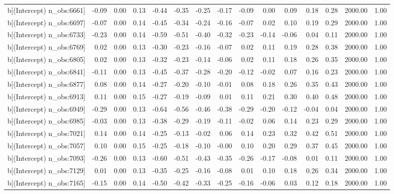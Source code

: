 \begin{table}[ht]
\begin{tabular}{rrrrrrrrrrrrrrr}
  b[(Intercept) n\_obs:6661] & -0.09 & 0.00 & 0.13 & -0.44 & -0.35 & -0.25 & -0.17 & -0.09 & 0.00 & 0.09 & 0.18 & 0.28 & 2000.00 & 1.00 \\ 
  b[(Intercept) n\_obs:6697] & -0.07 & 0.00 & 0.14 & -0.45 & -0.34 & -0.24 & -0.16 & -0.07 & 0.02 & 0.10 & 0.19 & 0.29 & 2000.00 & 1.00 \\ 
  b[(Intercept) n\_obs:6733] & -0.23 & 0.00 & 0.14 & -0.59 & -0.51 & -0.40 & -0.32 & -0.23 & -0.14 & -0.06 & 0.04 & 0.11 & 2000.00 & 1.00 \\ 
  b[(Intercept) n\_obs:6769] & 0.02 & 0.00 & 0.13 & -0.30 & -0.23 & -0.16 & -0.07 & 0.02 & 0.11 & 0.19 & 0.28 & 0.38 & 2000.00 & 1.00 \\ 
  b[(Intercept) n\_obs:6805] & 0.02 & 0.00 & 0.13 & -0.32 & -0.23 & -0.14 & -0.06 & 0.02 & 0.11 & 0.18 & 0.26 & 0.35 & 2000.00 & 1.00 \\ 
  b[(Intercept) n\_obs:6841] & -0.11 & 0.00 & 0.13 & -0.45 & -0.37 & -0.28 & -0.20 & -0.12 & -0.02 & 0.07 & 0.16 & 0.23 & 2000.00 & 1.00 \\ 
  b[(Intercept) n\_obs:6877] & 0.08 & 0.00 & 0.14 & -0.27 & -0.20 & -0.10 & -0.01 & 0.08 & 0.18 & 0.26 & 0.35 & 0.43 & 2000.00 & 1.00 \\ 
  b[(Intercept) n\_obs:6913] & 0.11 & 0.00 & 0.15 & -0.27 & -0.19 & -0.09 & 0.01 & 0.11 & 0.21 & 0.30 & 0.40 & 0.48 & 2000.00 & 1.00 \\ 
  b[(Intercept) n\_obs:6949] & -0.29 & 0.00 & 0.13 & -0.64 & -0.56 & -0.46 & -0.38 & -0.29 & -0.20 & -0.12 & -0.04 & 0.04 & 2000.00 & 1.00 \\ 
  b[(Intercept) n\_obs:6985] & -0.03 & 0.00 & 0.13 & -0.38 & -0.29 & -0.19 & -0.11 & -0.02 & 0.06 & 0.14 & 0.23 & 0.29 & 2000.00 & 1.00 \\ 
  b[(Intercept) n\_obs:7021] & 0.14 & 0.00 & 0.14 & -0.25 & -0.13 & -0.02 & 0.06 & 0.14 & 0.23 & 0.32 & 0.42 & 0.51 & 2000.00 & 1.00 \\ 
  b[(Intercept) n\_obs:7057] & 0.10 & 0.00 & 0.15 & -0.25 & -0.18 & -0.10 & -0.00 & 0.10 & 0.20 & 0.29 & 0.37 & 0.45 & 2000.00 & 1.00 \\ 
  b[(Intercept) n\_obs:7093] & -0.26 & 0.00 & 0.13 & -0.60 & -0.51 & -0.43 & -0.35 & -0.26 & -0.17 & -0.08 & 0.01 & 0.11 & 2000.00 & 1.00 \\ 
  b[(Intercept) n\_obs:7129] & 0.01 & 0.00 & 0.13 & -0.35 & -0.25 & -0.16 & -0.08 & 0.01 & 0.10 & 0.18 & 0.26 & 0.34 & 2000.00 & 1.00 \\ 
  b[(Intercept) n\_obs:7165] & -0.15 & 0.00 & 0.14 & -0.50 & -0.42 & -0.33 & -0.25 & -0.16 & -0.06 & 0.03 & 0.12 & 0.18 & 2000.00 & 1.00 \\ 

\end{tabular}
\end{table}
